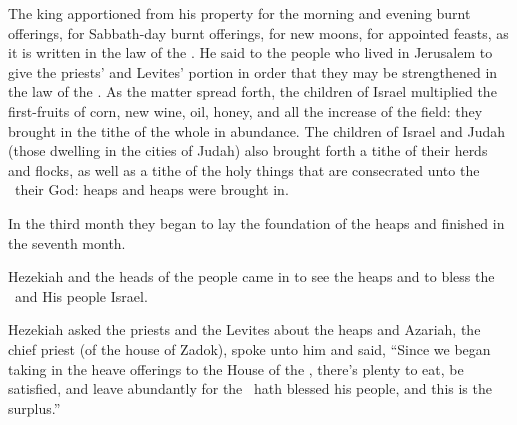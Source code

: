 \begin{inparaenum}
   The king apportioned from his property for the morning and evening burnt offerings, for Sabbath-day burnt offerings, for new moons, for appointed feasts, as it is written in the law of the \lord.%
   He said to the people who lived in Jerusalem to give the priests' and Levites' portion in order that they may be strengthened in the law of the \lord.%
   As the matter spread forth, the children of Israel multiplied the first-fruits of corn, new wine, oil, honey, and all the increase of the field: they brought in the tithe of the whole in abundance.%
   The children of Israel and Judah (those dwelling in the cities of Judah) also brought forth a tithe of their herds and flocks, as well as a tithe of the holy things that are consecrated unto the \lord\ their God: heaps and heaps were brought in.%
  
   In the third month they began to lay the foundation of the heaps and finished in the seventh month.%
  
   Hezekiah and the heads of the people came in to see the heaps and to bless the \lord\ and His people Israel.%
  
   Hezekiah asked the priests and the Levites about the heaps%
   and Azariah, the chief priest (of the house of Zadok), spoke unto him and said, ``Since we began taking in the heave offerings to the House of the \lord, there's plenty to eat, be satisfied, and leave abundantly for the \lord\ hath blessed his people, and this is the surplus.''%
  

\end{inparaenum}
